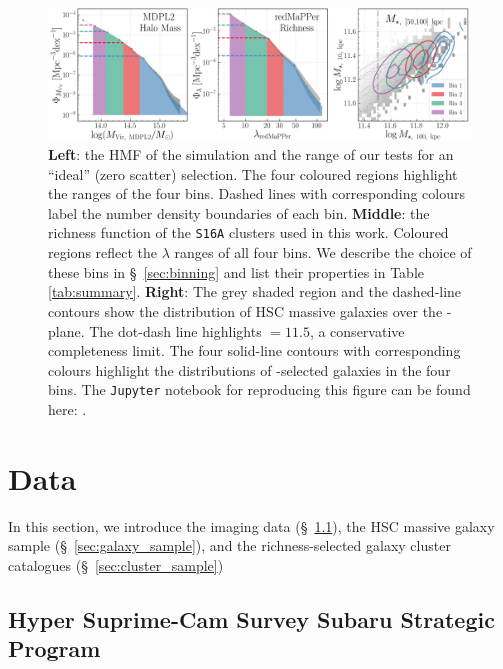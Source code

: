 \documentclass[fleqn,usenatbib,useAMS]{mnras}
\begin{document}
\begin{CJK*}{UTF8}{gbsn}
\begin{figure}
    \centering
    \includegraphics[width=\textwidth]{figure/fig_3}
    \caption{
        \textbf{Left}: the HMF of the  simulation and the \mvir{} range of our \topn{}
        tests for an ``ideal'' (zero scatter) \topn{} selection. 
        The four coloured regions highlight the \mvir{} ranges of the four \topn{} bins.
        Dashed lines with corresponding colours label the number density boundaries of each bin. 
        \textbf{Middle}: the richness function of the \texttt{S16A} \redm{} clusters used in this
        work. 
        Coloured regions reflect the $\lambda$ ranges of all four bins.
        We describe the choice of these bins in \S\ \ref{sec:binning} and list their properties
        in Table \ref{tab:summary}.
        \textbf{Right}:
        The grey shaded region and the dashed-line contours show the distribution of HSC
        massive galaxies over the - plane.
        The dot-dash line highlights \logmmax{}$=11.5$, a conservative  completeness
        limit.
        The four solid-line contours with corresponding colours highlight the distributions
        of -selected galaxies in the four \topn{} bins.
        The \texttt{Jupyter} notebook for reproducing this figure can be found here:
        \href{https://github.com/dr-guangtou/jianbing/blob/master/notebooks/figure/fig3.ipynb}{\faGithub}.
    }
    \label{fig:density_bins}
\end{figure}

\section{Data}
    \label{sec:data}

    In this section, we introduce the imaging data  (\S\ \ref{sec:hsc}), the HSC massive
    galaxy sample (\S\ \ref{sec:galaxy_sample}), and the richness-selected galaxy cluster
    catalogues (\S\ \ref{sec:cluster_sample})

\subsection{Hyper Suprime-Cam Survey Subaru Strategic Program}
    \label{sec:hsc}


\end{CJK*}
\end{document}
